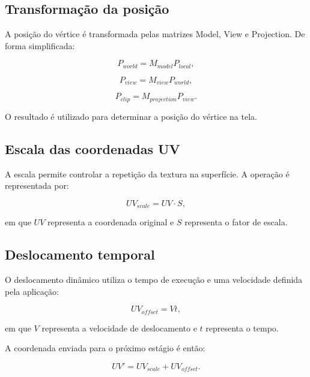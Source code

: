 \subsection{Transformação da posição}

A posição do vértice é transformada pelas matrizes Model, View e Projection.
De forma simplificada:

\begin{equation}
P_{world}=M_{model}P_{local},
\end{equation}

\begin{equation}
P_{view}=M_{view}P_{world},
\end{equation}

\begin{equation}
P_{clip}=M_{projection}P_{view}.
\end{equation}

O resultado é utilizado para determinar a posição do vértice na tela.

\subsection{Escala das coordenadas UV}

A escala permite controlar a repetição da textura na superfície. A operação
é representada por:

\begin{equation}
UV_{scale}=UV\cdot S,
\end{equation}

em que $UV$ representa a coordenada original e $S$ representa o fator de
escala.

\subsection{Deslocamento temporal}

O deslocamento dinâmico utiliza o tempo de execução e uma velocidade definida
pela aplicação:

\begin{equation}
UV_{offset}=Vt,
\end{equation}

em que $V$ representa a velocidade de deslocamento e $t$ representa o tempo.

A coordenada enviada para o próximo estágio é então:

\begin{equation}
UV'=UV_{scale}+UV_{offset}.
\end{equation}

